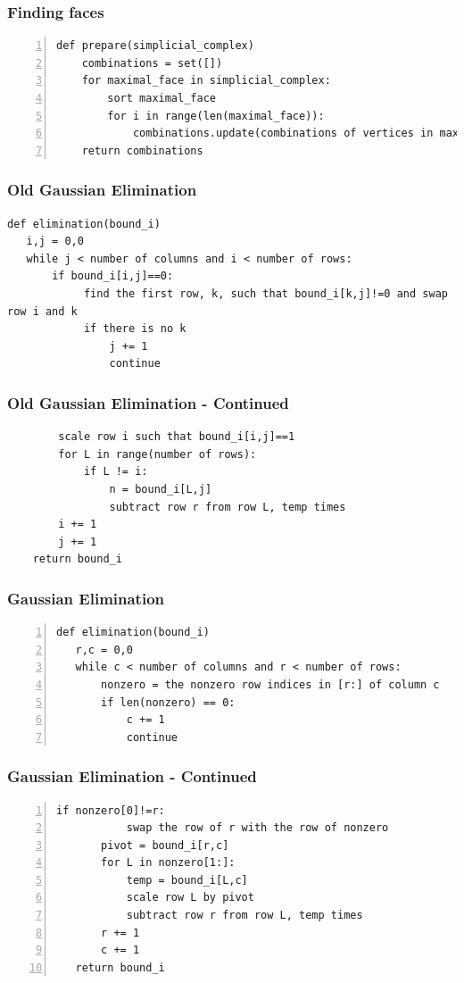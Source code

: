 \documentclass{beamer}
\begin{document}
\begin{frame}[fragile]
\frametitle{Finding faces}
\begin{lstlisting}[numbers=left]
def prepare(simplicial_complex)
    combinations = set([])
    for maximal_face in simplicial_complex:
    	sort maximal_face
        for i in range(len(maximal_face)):
            combinations.update(combinations of vertices in maximal_face of length i)
    return combinations    
\end{lstlisting}
\end{frame}

\begin{frame}[fragile]
\frametitle{Old Gaussian Elimination}
\begin{lstlisting}
def elimination(bound_i)
   i,j = 0,0
   while j < number of columns and i < number of rows:
       if bound_i[i,j]==0:
            find the first row, k, such that bound_i[k,j]!=0 and swap row i and k
            if there is no k
                j += 1
                continue
\end{lstlisting}
\end{frame}
\begin{frame}[fragile]
\frametitle{Old Gaussian Elimination - Continued}
\begin{lstlisting}
        scale row i such that bound_i[i,j]==1
        for L in range(number of rows):
            if L != i:
                n = bound_i[L,j]
                subtract row r from row L, temp times
        i += 1
        j += 1
    return bound_i
\end{lstlisting}
\end{frame}

\begin{frame}[fragile]
\frametitle{Gaussian Elimination}
\begin{lstlisting}[numbers=left]
def elimination(bound_i)
   r,c = 0,0
   while c < number of columns and r < number of rows:
       nonzero = the nonzero row indices in [r:] of column c
       if len(nonzero) == 0:
           c += 1
           continue
\end{lstlisting}
\end{frame}

\begin{frame}[fragile]
\frametitle{Gaussian Elimination - Continued}
\begin{lstlisting}[numbers=left]
       if nonzero[0]!=r:
           swap the row of r with the row of nonzero
       pivot = bound_i[r,c]
       for L in nonzero[1:]:
           temp = bound_i[L,c]
           scale row L by pivot
           subtract row r from row L, temp times
       r += 1
       c += 1
   return bound_i
\end{lstlisting}
\end{frame}
\end{document}
